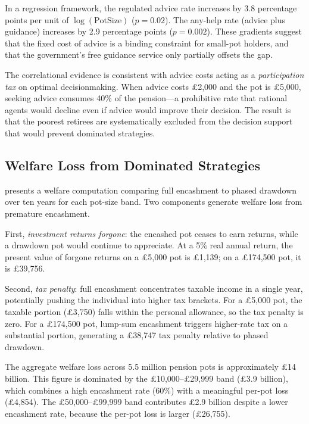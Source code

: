 \documentclass[12pt]{article}
\begin{document}
In a regression framework, the regulated advice rate increases by 3.8 percentage points per unit of $\log(\text{PotSize})$ ($p = 0.02$). The any-help rate (advice plus guidance) increases by 2.9 percentage points ($p = 0.002$). These gradients suggest that the fixed cost of advice is a binding constraint for small-pot holders, and that the government's free guidance service only partially offsets the gap.

The correlational evidence is consistent with advice costs acting as a \textit{participation tax} on optimal decisionmaking. When advice costs \pounds2,000 and the pot is \pounds5,000, seeking advice consumes 40\% of the pension---a prohibitive rate that rational agents would decline even if advice would improve their decision. The result is that the poorest retirees are systematically excluded from the decision support that would prevent dominated strategies.

\subsection{Welfare Loss from Dominated Strategies}

 presents a welfare computation comparing full encashment to phased drawdown over ten years for each pot-size band. Two components generate welfare loss from premature encashment.

First, \textit{investment returns forgone}: the encashed pot ceases to earn returns, while a drawdown pot would continue to appreciate. At a 5\% real annual return, the present value of forgone returns on a \pounds5,000 pot is \pounds1,139; on a \pounds174,500 pot, it is \pounds39,756.

Second, \textit{tax penalty}: full encashment concentrates taxable income in a single year, potentially pushing the individual into higher tax brackets. For a \pounds5,000 pot, the taxable portion (\pounds3,750) falls within the personal allowance, so the tax penalty is zero. For a \pounds174,500 pot, lump-sum encashment triggers higher-rate tax on a substantial portion, generating a \pounds38,747 tax penalty relative to phased drawdown.



The aggregate welfare loss across 5.5 million pension pots is approximately \pounds14 billion. This figure is dominated by the £10,000--\pounds29,999 band (\pounds3.9 billion), which combines a high encashment rate (60\%) with a meaningful per-pot loss (\pounds4,854). The \pounds50,000--\pounds99,999 band contributes \pounds2.9 billion despite a lower encashment rate, because the per-pot loss is larger (\pounds26,755).
\end{document}
